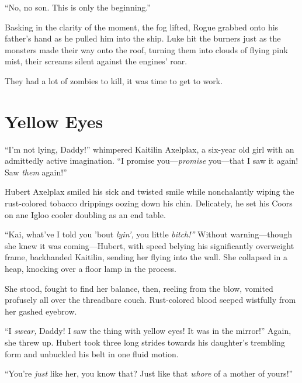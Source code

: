 ``No, no son. This is only the beginning.''



Basking in the clarity of the moment, the fog lifted, Rogue grabbed
onto his father's hand as he pulled him into the ship. Luke
hit the burners just as the monsters made their way onto the roof,
turning them into clouds of flying pink mist, their screams silent
against the engines' roar.



They had a lot of zombies to kill, it was time to get to work. 

 



\chapter{Yellow Eyes}



``I'm not lying, Daddy!'' whimpered Kaitilin Axelplax, a six-year old
girl with an admittedly active imagination. ``I promise
you---{\em promise} you---that I saw it again! Saw
{\em them} again!''



Hubert Axelplax smiled his sick and twisted smile while
nonchalantly wiping the rust-colored tobacco drippings oozing down
his chin. Delicately, he set his Coors on ane Igloo cooler doubling
as an end table.



``Kai, what've I told you 'bout {\em lyin',} you little
{\em bitch!''} Without warning---though she knew it was
coming---Hubert, with speed belying his significantly
overweight frame, backhanded Kaitilin, sending her flying into the
wall. She collapsed in a heap, knocking over a floor lamp in the
process.



She stood, fought to find her balance, then, reeling from the blow,
vomited profusely all over the threadbare couch. Rust-colored blood
seeped wistfully from her gashed eyebrow.



``I {\em swear,} Daddy! I saw the thing with yellow eyes! It was in
the mirror!'' Again, she threw up. Hubert took three long strides
towards his daughter's trembling form and unbuckled his belt in one
fluid motion.



``You're {\em just} like her, you know that? Just like that
{\em whore} of a mother of yours!''



